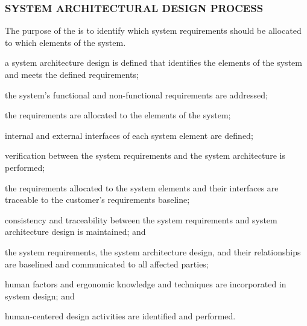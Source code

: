 		\newpage
		\subsubsection{SYSTEM ARCHITECTURAL DESIGN PROCESS\label{proc:system_architectural_design_process}}
		
			\begin{adjustwidth}{2em}{0pt} 
				
				The purpose of the  is to identify which system requirements should be allocated to which elements of the system.

			\end{adjustwidth}

			\begin{adjustwidth}{2em}{0pt} 

				\begin{compactitem}

					\item a system architecture design is defined that identifies the elements of the system and meets the defined requirements;

					\item the system's functional and non-functional requirements are addressed;

					\item the requirements are allocated to the elements of the system;

					\item internal and external interfaces of each system element are defined;

					\item verification between the system requirements and the system architecture is performed;

					\item the requirements allocated to the system elements and their interfaces are traceable to the customer's requirements baseline;

					\item consistency and traceability between the system requirements and system architecture design is maintained; and

					\item the system requirements, the system architecture design, and their relationships are baselined and communicated to all affected parties;

					\item human factors and ergonomic knowledge and techniques are incorporated in system design; and

					\item human-centered design activities are identified and performed.

				\end{compactitem}

			\end{adjustwidth}


